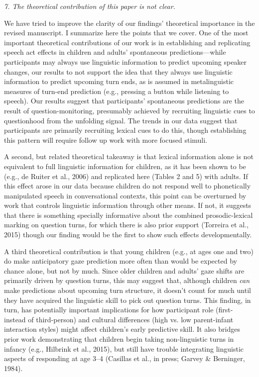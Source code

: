 \documentclass[11pt,a4paper]{letter} %
\begin{document}
\begin{letter}{}
\smallskip

\noindent \textit{7. The theoretical contribution of this paper is not clear.}

\noindent We have tried to improve the clarity of our findings' theoretical importance in the revised manuscript. I summarize here the points that we cover. One of the most important theoretical contributions of our work is in establishing and replicating speech act effects in children and adults' spontaneous predictions---while participants may always use linguistic information to predict upcoming speaker changes, our results to not support the idea that they always use linguistic information to predict upcoming turn ends, as is assumed in metalinguistic measures of turn-end prediction (e.g., pressing a button while listening to speech). Our results suggest that participants' spontaneous predictions are the result of question-monitoring, presumably achieved by recruiting linguistic cues to questionhood from the unfolding signal. The trends in our data suggest that participants are primarily recruiting lexical cues to do this, though establishing this pattern will require follow up work with more focused stimuli.

A second, but related theoretical takeaway is that lexical information alone is not equivalent to full linguistic information for children, as it has been shown to be (e.g., de Ruiter et al., 2006) and replicated here (Tables 2 and 5) with adults. If this effect arose in our data because children do not respond well to phonetically manipulated speech in conversational contexts, this point can be overturned by work that controls linguistic information through other means. If not, it suggests that there is something specially informative about the combined prosodic-lexical marking on question turns, for which there is also prior support (Torreira et al., 2015) though our finding would be the first to show such effects developmentally.

A third theoretical contribution is that young children (e.g., at ages one and two) do make anticipatory gaze prediction more often than would be expected by chance alone, but not by much. Since older children and adults' gaze shifts are primarily driven by question turns, this may suggest that, although children \textit{can} make predictions about upcoming turn structure, it doesn't count for much until they have acquired the linguistic skill to pick out question turns. This finding, in turn, has potentially important implications for how participant role (first- instead of third-person) and cultural differences (high vs. low parent-infant interaction styles) might affect children's early predictive skill. It also bridges prior work demonstrating that children begin taking non-linguistic turns in infancy (e.g., Hilbrink et al., 2015), but still have trouble integrating linguistic aspects of responding at age 3--4 (Casillas et al., in press; Garvey \& Berninger, 1984).


\end{letter}
\end{document}
